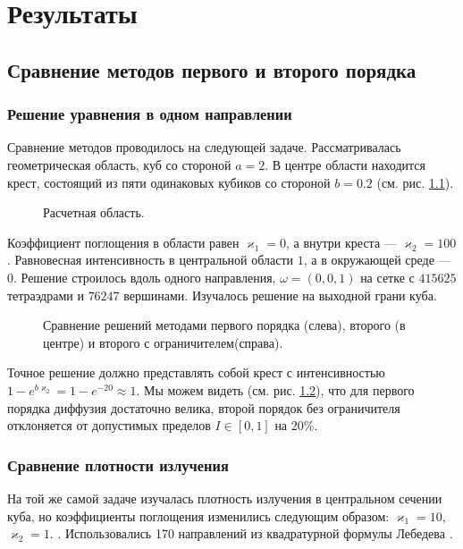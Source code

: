 \chapter{Результаты}

\section{Сравнение методов первого и второго порядка}
\subsection{Решение уравнения в одном направлении}
Сравнение методов проводилось на следующей задаче. Рассматривалась
геометрическая область, куб со стороной $a = 2$. В центре области находится
крест, состоящий из пяти одинаковых кубиков со стороной $b = 0.2$ (см. рис. \ref{fig:6}).
\begin{figure}[ht!]
\caption{Расчетная область.}
\label{fig:6}
\end{figure}
Коэффи\-циент поглощения в области равен $\varkappa_1=0$, а внутри креста --- $\varkappa_2 = 100$. Равновесная интенсивность в центральной области $1$, а в окружающей среде --- $0$. Решение строилось вдоль одного направления, $\omega = (0,0,1)$ на сетке с $415625$ тетраэдрами и $76247$ вершинами. Изучалось решение на выходной грани куба. 
\begin{figure}[ht!]
\caption{Сравнение решений методами первого порядка (слева), второго (в центре) и второго с ограничителем(справа).}
\label{fig:7}
\end{figure}

Точное решение должно представлять собой крест с интенсивностью $1 -
e^{b\varkappa_2} = 1-e^{-20} \approx 1$. Мы можем видеть (см. рис. \ref{fig:7}), что для первого порядка диффузия достаточно велика, второй порядок без ограничителя отклоняется от допустимых пределов $I \in [0, 1]$ на $20 \%$.
\subsection{Сравнение плотности излучения}
На той же самой задаче изучалась плотность излучения в центральном сечении куба, но коэффициенты поглощения изменились следующим образом: $\varkappa_1 = 10$, $\varkappa_2 = 1$. . Использовались 170 направлений из квадратурной формулы Лебедева \cite{lebedev_1999}. 

